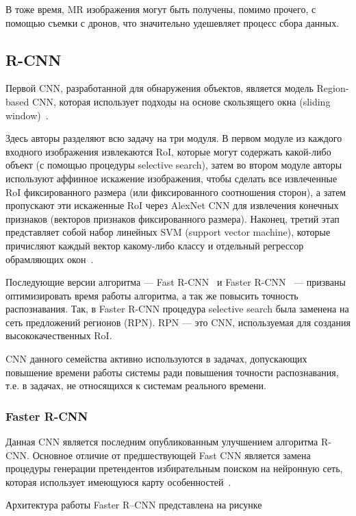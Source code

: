 В тоже время, MR изображения могут быть получены, помимо прочего, с помощью съемки с дронов, что значительно удешевляет процесс сбора данных.

\subsection{R-CNN}

Первой CNN, разработанной для обнаружения объектов, является модель Region-based CNN, которая использует подходы на основе скользящего окна (sliding window)~\cite{r-cnn}.

Здесь авторы разделяют всю задачу на три модуля. В первом модуле из каждого входного изображения извлекаются RoI, которые могут содержать какой-либо объект (с помощью процедуры selective search), затем во втором модуле авторы используют аффинное искажение изображения, чтобы сделать все извлеченные RoI фиксированного размера (или фиксированного соотношения сторон), а затем пропускают эти искаженные RoI через AlexNet CNN для извлечения конечных признаков (векторов признаков фиксированного размера). Наконец, третий этап представляет собой набор линейных SVM (support vector machine), которые причисляют каждый вектор какому-либо классу и отдельный регрессор обрамляющих окон~\cite{r-cnn}.

Последующие версии алгоритма --- Fast R-CNN~\cite{fast-r-cnn} и Faster R-CNN~\cite{faster-r-cnn} --- призваны оптимизировать время работы алгоритма, а так же повысить точность распознавания. Так, в Faster R-CNN процедура selective search была заменена на сеть предложений регионов (RPN). RPN --- это CNN, используемая для создания высококачественных RoI.

CNN данного семейства активно используются в задачах, допускающих повышение времени работы системы ради повышения точности распознавания, т.е. в задачах, не относящихся к системам реального времени.

\subsubsection{Faster R-CNN}

Данная CNN является последним опубликованным улучшением алгоритма R-CNN. Основное отличие от предшествующей Fast CNN является замена процедуры генерации претендентов избирательным поиском на нейронную сеть, которая использует имеющуюся карту особенностей~\cite{faster-r-cnn}.

Архитектура работы Faster R–CNN представлена на рисунке

